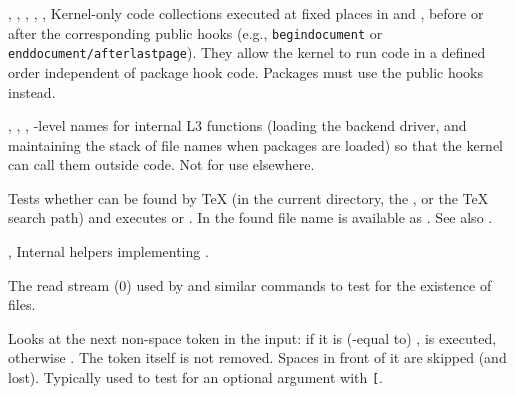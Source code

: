 \documentclass{l3in2edoc}
\begin{document}
\begin{function}[int]
  {
    \@kernel@before@begindocument,
    \@kernel@after@begindocument,
    \@kernel@after@begindocument@before,
    \@kernel@after@enddocument,
    \@kernel@before@enddocument@afterlastpage,
    \@kernel@after@enddocument@afterlastpage
  }
  Kernel-only code collections executed at fixed places in
   and , before or after the
  corresponding public hooks (e.g., \texttt{begindocument} or
  \texttt{enddocument/afterlastpage}). They allow the kernel to run
  code in a defined order independent of package hook code. Packages
  must use the public hooks instead.
\end{function}




\begin{function}[int]
  {
    \@expl@sys@load@backend@@,
    \@expl@push@filename@@,
    \@expl@push@filename@aux@@,
    \@expl@pop@filename@@
  }
  \LaTeXe{}-level names for internal L3 functions (loading the
  backend driver, and maintaining the stack of file names when
  packages are loaded) so that the kernel can call them outside
   code. Not for use elsewhere.
\end{function}



\begin{function}[user]
  {
    \IfFileExists
  }
  \begin{syntax}
       
  \end{syntax}
  Tests whether  can be found by \TeX{} (in the current
  directory, the , or the \TeX{} search path) and
  executes  or . In  the found file
  name is available as . See also .
\end{function}



\begin{function}[int]
  {
    \IfFileExists@,
    \IfFileExists@@
  }
  Internal helpers implementing .
\end{function}


\begin{variable}[int]
  {
    \@inputcheck
  }
  The read stream (0) used by  and similar commands to
  test for the existence of files.
\end{variable}


\begin{function}[]
  {
    \@ifnextchar
  }
  \begin{syntax}
       
  \end{syntax}
  Looks at the next non-space token in the input: if it is
  (-equal to) ,  is executed, otherwise
  . The token itself is not removed. Spaces in front of it
  are skipped (and lost). Typically used to test for an optional
  argument with \texttt{[}.
\end{function}
\end{document}
